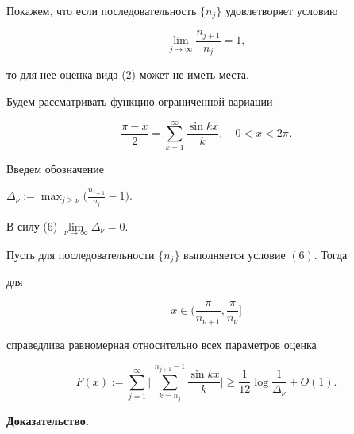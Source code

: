 Покажем, что если последовательность $ \{n_j \}$ удовлетворяет условию


\begin{equation}


\lim_{j \to \infty} \frac{n_{j + 1}}{n_j} = 1,


\end{equation}


то для нее оценка вида (2) может не иметь места.





Будем рассматривать функцию ограниченной вариации


$$


\frac{\pi - x}{2} = \sum_{k = 1}^{\infty} \frac{\sin kx}{k}, \quad


0 < x < 2 \pi.


$$


Введем обозначение


$\Delta_{\nu} := \max_{j \ge \nu} \big( \frac{n_{j + 1}}{n_j} - 1 \big)$.


В силу (6) $\lim\limits_{\nu \to \infty} \Delta_{\nu} = 0$.





\begin{thm}


Пусть для последовательности $ \{n_j \}$ выполняется условие $(6)$. Тогда


для


\begin{equation}


x \in \bigg ( \frac{\pi}{n_{\nu + 1}}, \frac{\pi}{n_{\nu}} \bigg ]


\end{equation}


справедлива равномерная относительно всех параметров оценка


\begin{equation}


F(x) := \sum_{j = 1}^{\infty} \bigg | \, \sum_{k = n_j}^{n_{j + 1} - 1}


\frac{\sin kx}{k} \bigg | \ge \frac{1}{12} \log \frac{1}{\Delta_{\nu}}


+ O(1).


\end{equation}


\end{thm}





{\bf Доказательство.}


